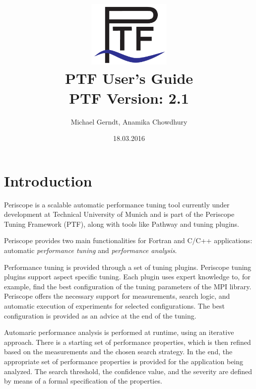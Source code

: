 \documentclass[11pt,oneside,a4paper]{book}
\begin{document}
\title{\includegraphics[width=4cm]{images/Ptf_LogoBlau}\\ \vspace{1cm}
\textsf{\bf \huge PTF User's Guide}\\
       \normalsize PTF Version: 2.1}
\author{Michael Gerndt, Anamika Chowdhury}
\date{18.03.2016}

\maketitle

\tableofcontents

\chapter{Introduction}

Periscope is a scalable automatic performance tuning tool currently under development at Technical University of Munich and is part of the Periscope Tuning Framework (PTF), along with tools like Pathway and tuning plugins.

Periscope provides two main functionalities for Fortran and C/C++ applications: automatic \textit{performance tuning} and \textit{performance analysis}.

Performance tuning is provided through a set of tuning plugins. Periscope tuning plugins support aspect specific tuning. Each plugin uses expert knowledge to, for example, find the best configuration of the tuning parameters of the MPI library. Periscope offers the necessary support for measurements, search logic, and automatic execution of experiments for selected configurations. The best configuration is provided as an advice at the end of the tuning.

Automaric performance analysis is performed at runtime, using an iterative approach. There is a starting set of performance properties, which is then refined based on the measurements and the chosen search strategy. In the end, the appropriate set of performance properties is provided for the application being analyzed. The search threshold, the confidence value, and the severity are defined by means of a formal specification of the properties.
\end{document}

